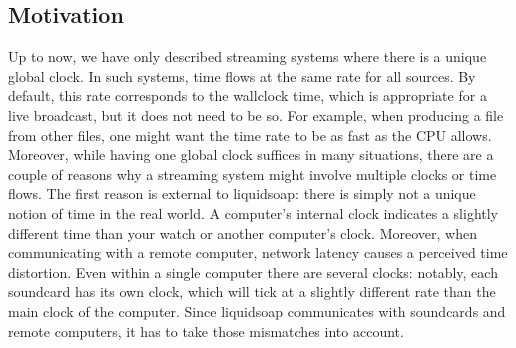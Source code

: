 \subsection{Motivation}
Up to now, we have only described streaming systems where there is
a unique global clock. In such systems, time flows at the same rate
for all sources.
By default, this rate corresponds to the wallclock time,
which is appropriate for a live broadcast,
but it does not need to be so.
For example, when producing a file from other files,
one might want the time rate to be as fast as the CPU allows.
Moreover, while having one global clock suffices in many situations,
there are a couple of reasons why a streaming system might involve multiple
clocks or time flows.
The first reason is external to liquidsoap: there is simply
not a unique notion of time in the real world.
A computer's internal clock indicates a slightly different time
than your watch or another computer's clock.
Moreover, when communicating with a remote computer, network
latency causes a perceived time distortion.
Even within a single computer there are several clocks: notably, each
soundcard has its own clock, which will tick at a slightly different
rate than the main clock of the computer.
Since liquidsoap communicates with soundcards and remote computers,
it has to take those mismatches into account.

